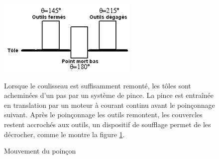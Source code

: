 \begin{figure}[htbp]
\begin{minipage}[c]{.3\linewidth}
\begin{center}
\includegraphics[width=\linewidth]{img/Poinc2.png}
\caption{Mouvement du poinçon}
\label{fig:image16}
\end{center}
\end{minipage}
\hfill
\begin{minipage}[c]{.65\linewidth}
Lorsque le coulisseau est suffisamment remonté, les tôles sont acheminées d'un pas par un système de pince. La pince est entraînée en translation par un moteur à courant continu avant le poinçonnage suivant. Après le poinçonnage les outils remontent, les couvercles
restent accrochés aux outils, un dispositif de soufflage permet de les décrocher, comme le montre la figure \ref{fig:image16}.
\end{minipage}
\end{figure}

